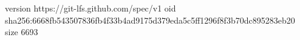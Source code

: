 version https://git-lfs.github.com/spec/v1
oid sha256:6668fb543507836fb4f33b4ad9175d379eda5c5ff1296f8f3b70dc895283eb20
size 6693
